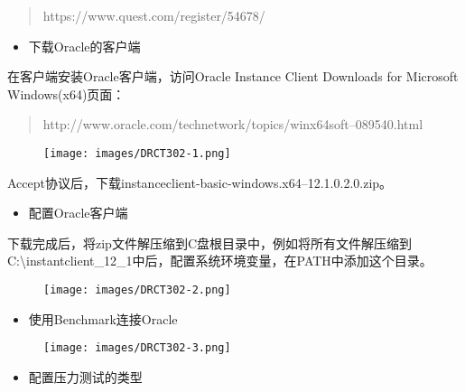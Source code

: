 \begin{quote}

https:\slash \slash www.quest.com\slash register\slash 54678\slash 
\end{quote}

\begin{itemize}
\item 下载Oracle的客户端

\end{itemize}

在客户端安装Oracle客户端，访问Oracle Instance Client Downloads for Microsoft Windows(x64)页面：

\begin{quote}

http:\slash \slash www.oracle.com\slash technetwork\slash topics\slash winx64soft--089540.html
\end{quote}

\begin{figure}[htbp]
\centering
\texttt{[image: images/DRCT302-1.png]}
\end{figure}

Accept协议后，下载instanceclient-basic-windows.x64--12.1.0.2.0.zip。

\begin{itemize}
\item 配置Oracle客户端

\end{itemize}

下载完成后，将zip文件解压缩到C盘根目录中，例如将所有文件解压缩到C:\textbackslash{}instantclient\_12\_1中后，配置系统环境变量，在PATH中添加这个目录。

\begin{figure}[htbp]
\centering
\texttt{[image: images/DRCT302-2.png]}
\end{figure}

\begin{itemize}
\item 使用Benchmark连接Oracle

\end{itemize}

\begin{figure}[htbp]
\centering
\texttt{[image: images/DRCT302-3.png]}
\end{figure}

\begin{itemize}
\item 配置压力测试的类型

\end{itemize}

